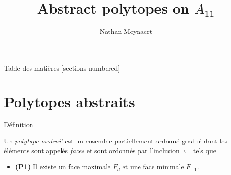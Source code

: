\documentclass[10pt]{beamer}
\title{Abstract polytopes on $A_{11}$}
\date{}
\author{Nathan Meynaert}
\begin{document}
\maketitle

\begin{frame}{Table des matières}
  [sections numbered]
  \tableofcontents[hideallsubsections]
\end{frame}

\section{Polytopes abstraits}

\begin{frame}{Définition}

  \begin{definition}
    Un \textit{polytope abstrait} est un ensemble partiellement ordonné gradué  dont les éléments sont appelés \textit{faces} et sont ordonnés par l'inclusion $\subseteq$ tels que
    \begin{itemize}
      \item \textbf{(P1)} Il existe un face maximale $F_d$ et une face minimale $F_{-1}$.
    \end{itemize}
  \end{definition}

\end{frame}
\end{document}
